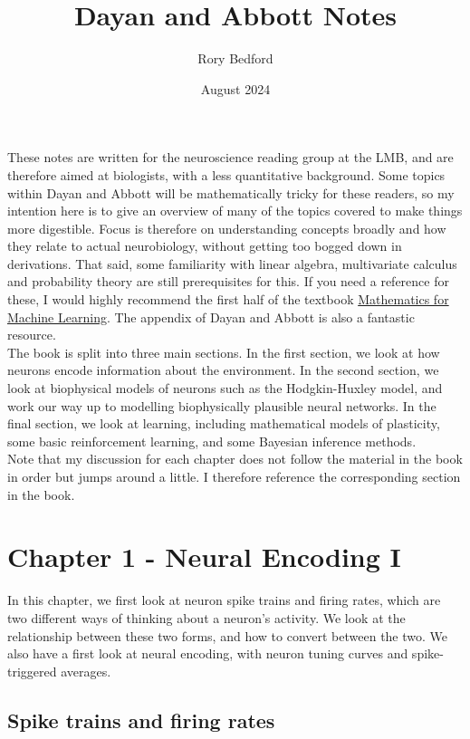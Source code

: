 \documentclass{article}
\title{Dayan and Abbott Notes}
\author{Rory Bedford}
\date{August 2024}
\begin{document}
\maketitle

These notes are written for the neuroscience reading group at the LMB, and are therefore aimed at biologists, with a less quantitative background. Some topics within Dayan and Abbott will be mathematically tricky for these readers, so my intention here is to give an overview of many of the topics covered to make things more digestible. Focus is therefore on understanding concepts broadly and how they relate to actual neurobiology, without getting too bogged down in derivations. That said, some familiarity with linear algebra, multivariate calculus and probability theory are still prerequisites for this. If you need a reference for these, I would highly recommend the first half of the textbook \href{https://mml-book.github.io/}{Mathematics for Machine Learning}. The appendix of Dayan and Abbott is also a fantastic resource.\\

The book is split into three main sections. In the first section, we look at how neurons encode information about the environment. In the second section, we look at biophysical models of neurons such as the Hodgkin-Huxley model, and work our way up to modelling biophysically plausible neural networks. In the final section, we look at learning, including mathematical models of plasticity, some basic reinforcement learning, and some Bayesian inference methods.\\

Note that my discussion for each chapter does not follow the material in the book in order but jumps around a little. I therefore reference the corresponding section in the book.

\section{Chapter 1 - Neural Encoding I}

In this chapter, we first look at neuron spike trains and firing rates, which are two different ways of thinking about a neuron's activity. We look at the relationship between these two forms, and how to convert between the two. We also have a first look at neural encoding, with neuron tuning curves and spike-triggered averages.

\subsection{Spike trains and firing rates}
\end{document}

